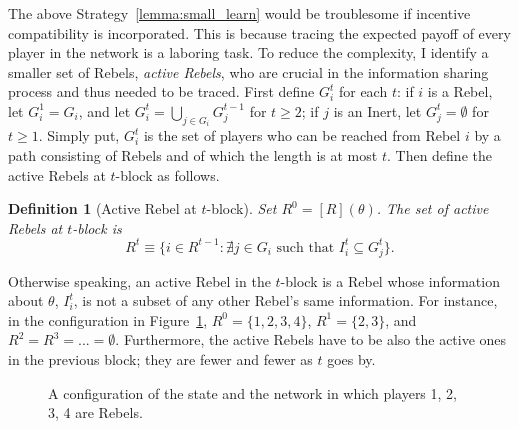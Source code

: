 \documentclass[12pt,letter]{article}
\newtheorem{definition}{Definition}[section]
\theoremstyle{definition}
\theoremstyle{remark}
\theoremstyle{claim}
\begin{document}
The above Strategy~\ref{lemma:small_learn} would be troublesome if incentive compatibility is incorporated. This is because tracing the expected payoff of every player in the network is a laboring task. To reduce the complexity, I identify a smaller set of Rebels, \textit{active Rebels}, who are crucial in the information sharing process and thus needed to be traced. First define $G^t_i$ for each $t$: if $i$ is a Rebel, let $G^1_i= G_i$, and let $G^t_i= \bigcup_{j\in G_i} G^{t-1}_j$ for $t\geq 2$; if $j$ is an Inert, let $G^t_j=\emptyset$ for $t\geq 1$. Simply put, $G^t_i$ is the set of players who can be reached from Rebel $i$ by a path consisting of Rebels and of which the length is at most $t$. Then define the active Rebels at $t$-block as follows.
\begin{definition}[Active Rebel at $t$-block]
Set $R^0=[R](\theta)$. The set of active Rebels at $t$-block is 
\[\text{$R^t\equiv \{i\in R^{t-1}: \nexists j\in G_i \text{ such that }I^t_i\subseteq G^t_j\}$}.\]

\end{definition}
Otherwise speaking, an active Rebel in the $t$-block is a Rebel whose information about $\theta$, $I^t_i$, is not a subset of any other Rebel's same information. For instance, in the configuration in Figure~\ref{fig:T-round-4}, $R^0=\{1,2,3,4\}$, $R^1=\{2,3\}$, and $R^2=R^3=...=\emptyset$. Furthermore, the active Rebels have to be also the active ones in the previous block; they are fewer and fewer as $t$ goes by. 

\begin{figure}

\begin{center}
\end{center}
\caption{A configuration of the state and the network in which players 1, 2, 3, 4 are Rebels.}
\label{fig:T-round-4}
\end{figure}
\end{document}
